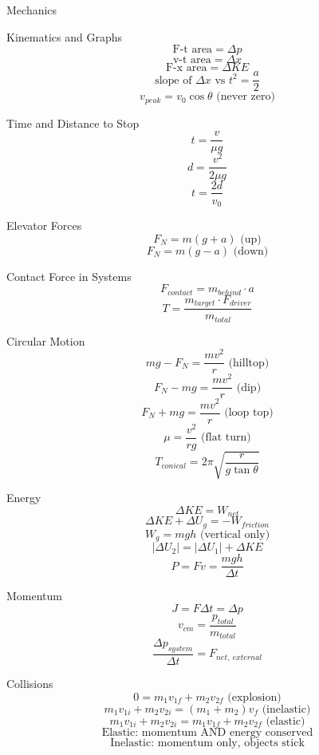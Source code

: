 Mechanics

Kinematics and Graphs
$$\text{F-t area} = \Delta p$$
$$\text{v-t area} = \Delta x$$
$$\text{F-x area} = \Delta KE$$
$$\text{slope of } \Delta x \text{ vs } t^2 = \frac{a}{2}$$
$$v_{peak} = v_0\cos\theta \text{ (never zero)}$$

Time and Distance to Stop
$$t = \frac{v}{\mu g}$$
$$d = \frac{v^2}{2\mu g}$$
$$t = \frac{2d}{v_0}$$

Elevator Forces
$$F_N = m(g+a) \text{ (up)}$$
$$F_N = m(g-a) \text{ (down)}$$

Contact Force in Systems
$$F_{contact} = m_{behind} \cdot a$$
$$T = \frac{m_{target} \cdot F_{driver}}{m_{total}}$$

Circular Motion
$$mg - F_N = \frac{mv^2}{r} \text{ (hilltop)}$$
$$F_N - mg = \frac{mv^2}{r} \text{ (dip)}$$
$$F_N + mg = \frac{mv^2}{r} \text{ (loop top)}$$
$$\mu = \frac{v^2}{rg} \text{ (flat turn)}$$
$$T_{conical} = 2\pi\sqrt{\frac{r}{g\tan\theta}}$$

Energy
$$\Delta KE = W_{net}$$
$$\Delta KE + \Delta U_g = -W_{friction}$$
$$W_g = mgh \text{ (vertical only)}$$
$$|\Delta U_2| = |\Delta U_1| + \Delta KE$$
$$P = Fv = \frac{mgh}{\Delta t}$$

Momentum
$$J = F\Delta t = \Delta p$$
$$v_{cm} = \frac{p_{total}}{m_{total}}$$
$$\frac{\Delta p_{system}}{\Delta t} = F_{net,\ external}$$

Collisions
$$0 = m_1v_{1f} + m_2v_{2f} \text{ (explosion)}$$
$$m_1v_{1i} + m_2v_{2i} = (m_1+m_2)v_f \text{ (inelastic)}$$
$$m_1v_{1i} + m_2v_{2i} = m_1v_{1f} + m_2v_{2f} \text{ (elastic)}$$
$$\text{Elastic: momentum AND energy conserved}$$
$$\text{Inelastic: momentum only, objects stick}$$
